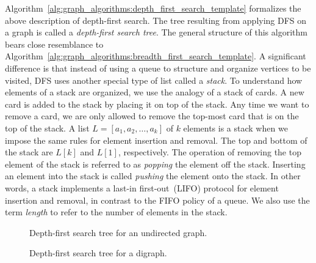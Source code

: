 Algorithm~\ref{alg:graph_algorithms:depth_first_search_template}
formalizes the above description of depth-first
search. The tree resulting from applying
DFS on a graph is called a
\emph{depth-first search tree}. The
general structure of this algorithm bears close resemblance to
Algorithm~\ref{alg:graph_algorithms:breadth_first_search_template}. A
significant difference is that instead of using a queue
to structure and organize vertices to be visited, DFS uses
another special type of list called a
\emph{stack}. To understand how elements of a stack are
organized, we use the analogy of a stack of cards. A new
card is added to the stack by placing it on top of the stack. Any time
we want to remove a card, we are only allowed to remove the top-most
card that is on the top of the stack. A list
$L = [a_1, a_2, \dots, a_k]$ of $k$ elements is a stack when we impose
the same rules for element insertion and removal. The top and bottom
of the stack are $L[k]$ and $L[1]$, respectively. The operation of
removing the top element of the stack is referred to as
\emph{popping} the element off the stack. Inserting
an element into the stack is called \emph{pushing}
the element onto the stack. In other words, a stack implements a
last-in first-out~(LIFO)
protocol for element insertion and removal, in contrast to the
FIFO policy of a queue. We also use the term
\emph{length} to refer to the number of elements
in the stack.

\begin{figure}[!htbp]
\centering
{}

\caption{Depth-first search tree for an undirected graph.}
\label{fig:graph_algorithms:depth_first_search_undirected}
\end{figure}

\begin{figure}[!htbp]
\centering
{}

\caption{Depth-first search tree for a digraph.}
\label{fig:graph_algorithms:depth_first_search_directed}
\end{figure}

